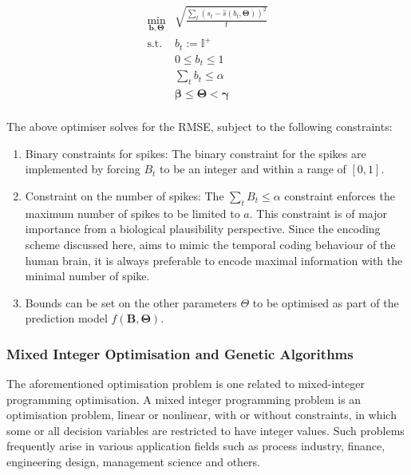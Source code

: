 \begin{equation}
\begin{matrix}
\displaystyle \min_{\mathbf{b},\mathbf{\Theta}} &  \displaystyle \sqrt{\frac{\sum_t(s_t-\hat{s}(b_t,\mathbf{\Theta}))^2}{t}} \\
\textrm{s.t.} & \displaystyle b_t:=\mathbb{I}^+ \\
& \displaystyle 0\leq b_t\leq 1\\ 
& \displaystyle \sum_t b_t\leq \alpha  \\
& \displaystyle \boldsymbol{\beta}\leq \boldsymbol{\Theta} < \boldsymbol{\gamma} \\ 
\end{matrix}
\label{eq:opt}
\end{equation}

The above optimiser solves for the RMSE, subject to the following constraints:
\begin{enumerate}
	\item Binary constraints for spikes: The binary constraint for the spikes are implemented by forcing $B_t$ to be an integer and within a range of $[0, 1]$.
	\item Constraint on the number of spikes: The $\sum_t B_t\leq \alpha$ constraint enforces the maximum number of spikes to be limited to $a$. This constraint is of major importance from a biological plausibility perspective. Since the encoding scheme discussed here, aims to mimic the temporal coding behaviour of the human brain, it is always preferable to encode maximal information with the minimal number of spike.  
	\item Bounds can be set on the other parameters $\Theta$ to be optimised as part of the prediction model $f(\mathbf{B, \Theta})$.
\end{enumerate}

\subsubsection{Mixed Integer Optimisation and Genetic Algorithms}
The aforementioned optimisation problem is one related to mixed-integer programming optimisation. A mixed integer programming problem is an optimisation problem, linear or nonlinear, with or without constraints, in which some or all decision variables are restricted to have integer values. Such problems frequently arise in various application fields such as process industry, finance, engineering design, management science and others. 

